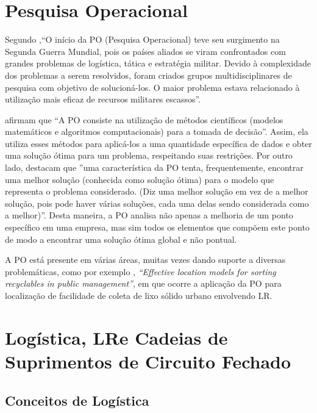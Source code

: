 \section{Pesquisa Operacional}\label{Pesquisa Operacional}
Segundo ,``O início da PO (Pesquisa Operacional) teve seu surgimento na Segunda Guerra Mundial, pois os países aliados se viram confrontados com grandes problemas de logística, tática e estratégia militar. Devido à complexidade dos problemas a serem resolvidos, foram criados grupos multidisciplinares de pesquisa com objetivo de solucioná-los. O maior problema estava relacionado à utilização mais eficaz de recursos militares escassos''.

 afirmam que ``A PO consiste na utilização de métodos científicos (modelos matemáticos e algoritmos computacionais) para a tomada de decisão''. Assim, ela utiliza esses métodos para aplicá-los a uma quantidade específica de dados e obter uma solução ótima para um problema, respeitando suas restrições. Por outro lado,  destacam que   ''uma característica da PO tenta, frequentemente, encontrar uma melhor solução (conhecida como solução ótima) para o modelo que representa o problema considerado. (Diz uma melhor solução em vez de a melhor solução, pois pode haver várias soluções, cada uma delas sendo considerada como a melhor)''. Desta maneira, a PO analisa não apenas a melhoria de um ponto específico em uma empresa, mas sim todos os elementos que compõem este ponto de modo a encontrar uma solução ótima global e não pontual.

A PO está presente em várias áreas, muitas vezes dando suporte a diversas problemáticas, como por exemplo , \emph{``Effective location models for sorting recyclables in public management''}, em que ocorre a aplicação da PO para localização de facilidade de coleta de lixo sólido urbano envolvendo LR.

\section{Logística, LRe Cadeias de Suprimentos de Circuito Fechado}\label{Logística, LRe Cadeias de Suprimentos de Circuito Fechado}

\subsection{Conceitos de Logística}\label{Conceitos Fundamentais de Logística}

